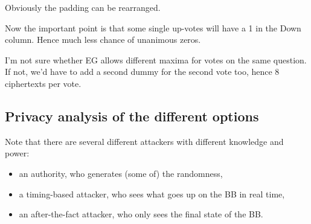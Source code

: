 \documentclass[10pt,a4paper]{article}
\begin{document}
Obviously the padding can be rearranged.

Now the important point is that some single up-votes will have a 1 in the Down column. Hence much less chance of unanimous zeros.

I'm not sure whether EG allows different maxima for votes on the same question. If not, we'd have to add a second dummy for the second vote too, hence 8 ciphertexts per vote.

\subsection{Privacy analysis of the different options}
Note that there are several different attackers with different knowledge and power:
\begin{itemize}
	\item an authority, who generates (some of) the randomness,
	\item a timing-based attacker, who sees what goes up on the BB in real time,
	\item an after-the-fact attacker, who only sees the final state of the BB.
\end{itemize}


\end{document}
